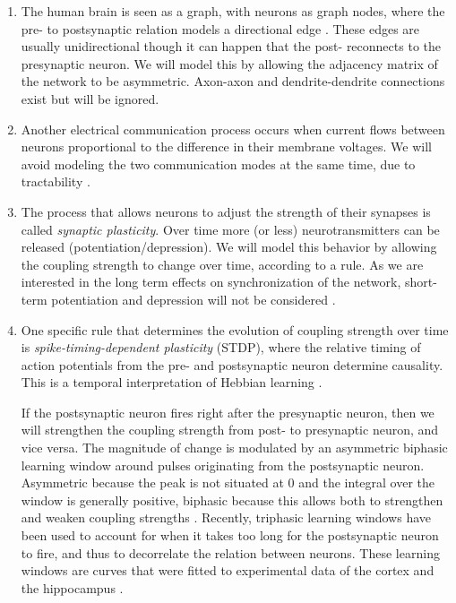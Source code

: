\begin{enumerate}
\item The human brain is seen as a graph, with neurons as graph nodes, where the pre- to postsynaptic relation models a directional edge \cite{Bullmore2010}. These edges are usually unidirectional though it can happen that the post- reconnects to the presynaptic neuron. We will model this by allowing the adjacency matrix of the network to be asymmetric. Axon-axon and dendrite-dendrite connections exist but will be ignored. \cite{Didier1997} 


\item Another electrical communication process occurs when current flows between neurons proportional to the difference in their membrane voltages. We will avoid modeling the two communication modes at the same time, due to tractability \cite{Martens2020}. 


\item The process that allows neurons to adjust the strength of their synapses is called \textsl{synaptic plasticity}. Over time more (or less) neurotransmitters can be released (potentiation/depression). We will model this behavior by allowing the coupling strength to change over time, according to a rule. As we are interested in the long term effects on synchronization of the network, short-term potentiation and depression will not be considered \cite{MathFoundationNeuroscience}.


\item One specific rule that determines the evolution of coupling strength over time is \textsl{spike-timing-dependent plasticity} (STDP), where the relative timing of action potentials from the pre- and postsynaptic neuron determine causality. This is a temporal interpretation of Hebbian learning \cite{Kempter1999, Gerstner2002}. 

If the postsynaptic neuron fires right after the presynaptic neuron, then we will strengthen the coupling strength from post- to presynaptic neuron, and vice versa. The magnitude of change is modulated by an asymmetric biphasic learning window around pulses originating from the postsynaptic neuron. Asymmetric because the peak is not situated at 0 and the integral over the window is generally positive, biphasic because this allows both to strengthen and weaken coupling strengths \cite{Gerstner2002}. Recently, triphasic learning windows have been used to account for when it takes too long for the postsynaptic neuron to fire, and thus to decorrelate the relation between neurons. These learning windows are curves that were fitted to experimental data of the cortex and the hippocampus \cite{ChrolCannon2014}.


\end{enumerate}

